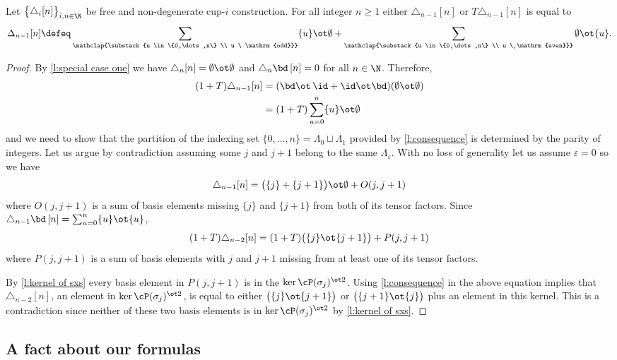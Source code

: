 \begin{lemma}\label{l:special case two}
	Let $\big\{ \triangle_i [n] \big\}_{i,n\in\N}$ be free and non-degenerate \mbox{cup-$i$} construction.
	For all integer $n \geq 1$ either $\triangle_{n-1} [n]$ or $T \triangle_{n-1} [n]$ is equal to
	\[
	\Delta_{n-1} [n] \defeq
	\sum_{\mathclap{\substack{u \in \{0,\dots,n\} \\ u \ \mathrm{odd}}}} \{u\} \ot \emptyset +
	\sum_{\mathclap{\substack{u \in \{0,\dots,n\} \\ u \ \mathrm{even}}}} \emptyset \ot \{u\}.
	\]
\end{lemma}

\begin{proof}
	By \cref{l:special case one} we have $\triangle_{n} [n] = \emptyset \ot \emptyset$ and $\triangle_{n} \bd \, [n] = 0$ for all $n \in \N$.
	Therefore,
	\begin{align*}
	(1+T) \triangle_{n-1} [n] &=
	(\bd \ot \, \id + \id \ot \bd) (\emptyset \ot \emptyset) \\ &=
	(1+T) \sum_{u=0}^n \{u\} \ot \emptyset
	\end{align*}
	and we need to show that the partition of the indexing set $\{0, \dots, n\} = \Lambda_0 \sqcup \Lambda_1$ provided by \cref{l:consequence} is determined by the parity of integers.
	Let us argue by contradiction assuming some $j$ and $j+1$ belong to the same $\Lambda_{\varepsilon}$.
	With no loss of generality let us assume $\varepsilon = 0$ so we have
	\[
	\triangle_{n-1} [n] = \big( \{j\} + \{j+1\} \big) \ot \emptyset + O(j, j+1)
	\]
	where $O(j, j+1)$ is a sum of basis elements missing $\{j\}$ and $\{j+1\}$ from both of its tensor factors.
	Since $\triangle_{n-1} \bd \, [n] = \sum_{u=0}^{n} \{u\} \ot \{u\}$,
	\[
	(1+T) \triangle_{n-2} [n] = (1+T) \big( \{j\} \ot \{j+1\} \big) + P(j, j+1)
	\]
	where $P(j, j+1)$ is a sum of basis elements with $j$ and $j+1$ missing from at least one of its tensor factors.

	By \cref{l:kernel of sxs} every basis element in $P(j,j+1)$ is in the $\ker \cP(\sigma_j)^{\ot 2}$.
	Using \cref{l:consequence} in the above equation implies that $\triangle_{n-2}[n]$, an element in $\ker \cP(\sigma_j)^{\ot 2}$, is equal to either $\big( \{j\} \ot \{j+1\} \big)$ or $\big( \{j+1\} \ot \{j\} \big)$ plus an element in this kernel.
	This is a contradiction since neither of these two basis elements is in $\ker \cP(\sigma_j)^{\ot 2}$ by \cref{l:kernel of sxs}.
\end{proof}

\subsection{A fact about our formulas}\label{ss:fact}

